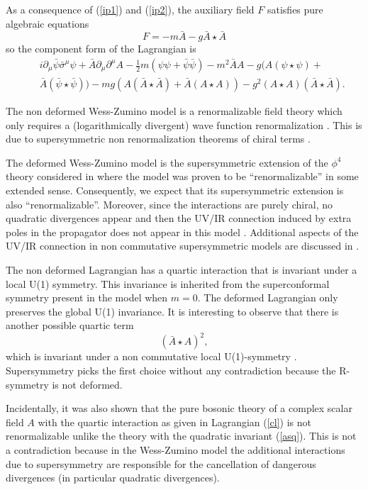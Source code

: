 \documentclass[a4paper,12pt]{article}
\begin{document}
As a consequence  of (\ref{ip1}) and (\ref{ip2}), the auxiliary field $F$
satisfies pure algebraic
 equations 
$$
F=-m\bar A-g\bar A\star\bar A
$$
so the component form of the Lagrangian is
\begin{eqnarray}
&& i\partial_\mu\bar\psi\bar\sigma^\mu\psi +\bar A\partial_\mu\partial^\mu
  A-\frac{1}{ 2}m(\psi\psi +\bar \psi \bar\psi) -m^2\bar A A
-g(A(\psi\star \psi) +\nonumber\\&&\bar A(\bar \psi\star \bar\psi))
-mg(A(\bar A\star \bar A )+ \bar A(A\star A))
-g^2(A\star A)(\bar A\star \bar A).
\label{cl}
\end{eqnarray}

The non deformed Wess-Zumino model is a renormalizable field theory which
only requires 
a (logarithmically  divergent) wave function renormalization \cite{wz,
iz}. 
This is due to supersymmetric non renormalization theorems of chiral terms
\cite{fiz}.

The deformed Wess-Zumino model is the supersymmetric extension of the
$\phi^4$ theory 
considered in \cite{mrs} where the model was proven to 
be ``renormalizable''  in some extended sense.
Consequently, we expect that its supersymmetric extension is also
``renormalizable''. Moreover,
since the interactions are purely chiral, no quadratic divergences  appear
and then the UV/IR
connection induced by extra poles in the propagator \cite{mrs} does not
appear in this model \cite{cr}. Additional aspects of the UV/IR
connection in non commutative supersymmetric models are discussed in
\cite{gp, ss}. 
 

The non deformed Lagrangian has a quartic interaction that is invariant
under a local
 U(1) symmetry. This invariance is inherited from the superconformal
symmetry 
present in the model when 
$m=0$. The deformed Lagrangian only preserves the global U(1) invariance. 
It is interesting to observe that there is another possible quartic term
 \begin{equation}
(\bar A\star  A)^2,
\label{asq}
\end{equation}
which is  invariant
under a non commutative local U(1)-symmetry \cite{ybk}. Supersymmetry
picks 
the first choice without any contradiction because the R-symmetry is not
deformed.

Incidentally, it was also  shown that the pure bosonic theory of a complex
 scalar field $A$ with the quartic
interaction as given in Lagrangian (\ref{cl}) is not renormalizable unlike
the theory
with the quadratic invariant (\ref{asq}). This is not a contradiction
because in the Wess-Zumino model the additional interactions due to
supersymmetry are
 responsible for the cancellation of dangerous divergences (in particular
quadratic divergences).
\end{document}

